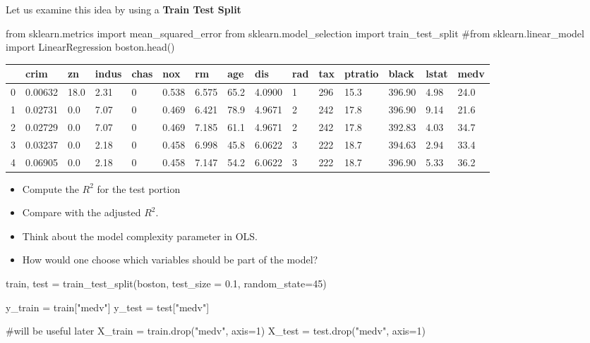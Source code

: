 \documentclass[
  letterpaper,
  DIV=11,
  numbers=noendperiod]{scrreprt}
\newenvironment{Shaded}{\begin{snugshade}}{\end{snugshade}}
\newcommand{\CommentTok}[1]{\textcolor[rgb]{0.37,0.37,0.37}{#1}}
\newcommand{\DecValTok}[1]{\textcolor[rgb]{0.68,0.00,0.00}{#1}}
\newcommand{\FloatTok}[1]{\textcolor[rgb]{0.68,0.00,0.00}{#1}}
\newcommand{\ImportTok}[1]{\textcolor[rgb]{0.00,0.46,0.62}{#1}}
\newcommand{\NormalTok}[1]{\textcolor[rgb]{0.00,0.23,0.31}{#1}}
\newcommand{\OperatorTok}[1]{\textcolor[rgb]{0.37,0.37,0.37}{#1}}
\newcommand{\StringTok}[1]{\textcolor[rgb]{0.13,0.47,0.30}{#1}}
\providecommand{\tightlist}{%
  \setlength{\itemsep}{0pt}\setlength{\parskip}{0pt}}\usepackage{longtable,booktabs,array}
\begin{document}
Let us examine this idea by using a \textbf{Train Test Split}

\begin{Shaded}
\begin{Highlighting}[]
\ImportTok{from}\NormalTok{ sklearn.metrics }\ImportTok{import}\NormalTok{ mean\_squared\_error}
\ImportTok{from}\NormalTok{ sklearn.model\_selection }\ImportTok{import}\NormalTok{ train\_test\_split}
\CommentTok{\#from sklearn.linear\_model import LinearRegression}
\NormalTok{boston.head()}
\end{Highlighting}
\end{Shaded}

\begin{longtable}[]{@{}lllllllllllllll@{}}
\toprule()
& crim & zn & indus & chas & nox & rm & age & dis & rad & tax & ptratio
& black & lstat & medv \\
\midrule()
\endhead
0 & 0.00632 & 18.0 & 2.31 & 0 & 0.538 & 6.575 & 65.2 & 4.0900 & 1 & 296
& 15.3 & 396.90 & 4.98 & 24.0 \\
1 & 0.02731 & 0.0 & 7.07 & 0 & 0.469 & 6.421 & 78.9 & 4.9671 & 2 & 242 &
17.8 & 396.90 & 9.14 & 21.6 \\
2 & 0.02729 & 0.0 & 7.07 & 0 & 0.469 & 7.185 & 61.1 & 4.9671 & 2 & 242 &
17.8 & 392.83 & 4.03 & 34.7 \\
3 & 0.03237 & 0.0 & 2.18 & 0 & 0.458 & 6.998 & 45.8 & 6.0622 & 3 & 222 &
18.7 & 394.63 & 2.94 & 33.4 \\
4 & 0.06905 & 0.0 & 2.18 & 0 & 0.458 & 7.147 & 54.2 & 6.0622 & 3 & 222 &
18.7 & 396.90 & 5.33 & 36.2 \\
\bottomrule()
\end{longtable}

\begin{itemize}
\tightlist
\item
  Compute the \(R^2\) for the test portion
\item
  Compare with the adjusted \(R^2\).
\item
  Think about the model complexity parameter in OLS.
\item
  How would one choose which variables should be part of the model?
\end{itemize}

\begin{Shaded}
\begin{Highlighting}[]
\NormalTok{train, test }\OperatorTok{=}\NormalTok{ train\_test\_split(boston, test\_size }\OperatorTok{=} \FloatTok{0.1}\NormalTok{, random\_state}\OperatorTok{=}\DecValTok{45}\NormalTok{)}

\NormalTok{y\_train }\OperatorTok{=}\NormalTok{ train[}\StringTok{"medv"}\NormalTok{]}
\NormalTok{y\_test }\OperatorTok{=}\NormalTok{ test[}\StringTok{"medv"}\NormalTok{]}

\CommentTok{\#will be useful later}
\NormalTok{X\_train }\OperatorTok{=}\NormalTok{ train.drop(}\StringTok{"medv"}\NormalTok{, axis}\OperatorTok{=}\DecValTok{1}\NormalTok{)}
\NormalTok{X\_test }\OperatorTok{=}\NormalTok{ test.drop(}\StringTok{"medv"}\NormalTok{, axis}\OperatorTok{=}\DecValTok{1}\NormalTok{)}
\end{Highlighting}
\end{Shaded}
\end{document}
